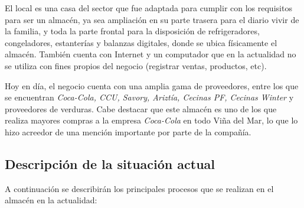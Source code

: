 \documentclass[letterpaper,12pt]{article}
\begin{document}
El local es una casa del sector que fue adaptada para cumplir con los requisitos para ser un almacén, ya sea ampliación en 
su parte trasera para el diario vivir de la familia, y toda la parte frontal para la disposición de 
refrigeradores, congeladores, estanterías y balanzas digitales, donde se ubica físicamente el almacén. También cuenta con
Internet y un computador que en la actualidad no se utiliza con fines propios del negocio (registrar ventas, productos, etc).

Hoy en día, el negocio cuenta con una amplia gama de proveedores, entre los que se encuentran 
\emph{Coca-Cola, CCU, Savory, Ariztía, Cecinas PF, Cecinas Winter} y proveedores de verduras.
Cabe destacar que este almacén es uno de los que realiza mayores compras a la empresa \emph{Coca-Cola} en todo
Viña del Mar, lo que lo hizo acreedor de una mención importante por parte de la compañía.

\newpage

\subsection{Descripción de la situación actual}

A continuación se describirán los principales procesos que se realizan en el almacén en la actualidad: 
\end{document}
